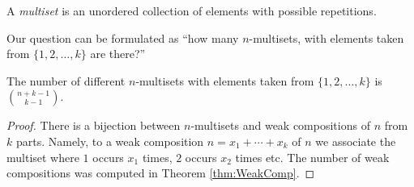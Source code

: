 \begin{page}

\begin{dfn}
A \emph{multiset} is an unordered collection of elements with possible repetitions.
\end{dfn}

\end{page}

\begin{page}

Our question can be formulated as ``how many $n$-multisets, with elements taken from $\{1, 2, \ldots, k\}$ are there?''


\end{page}

\begin{page}

\begin{thm}
The number of different $n$-multisets with elements taken from $\{1, 2, \ldots, k\}$ is $\binom{n+k-1}{k-1}$.
\end{thm}

\end{page}

\begin{page}

\begin{proof}
There is a bijection between $n$-multisets and weak compositions of $n$ from $k$ parts.
Namely, to a weak composition $n = x_1 + \cdots + x_k$ of $n$ we associate the multiset
where $1$ occurs $x_1$ times, $2$ occurs $x_2$ times etc.
The number of weak compositions was computed in Theorem \ref{thm:WeakComp}.
\end{proof}



\end{page}

